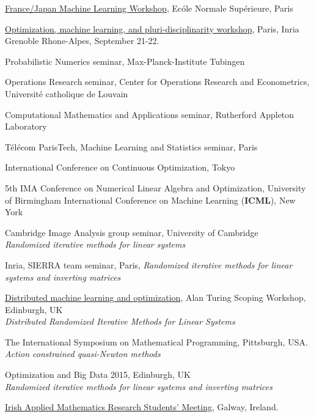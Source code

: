 \begin{bibsection}
\item  \href{http://fjml.marcocuturi.net/speakers/}{France/Japan Machine Learning Workshop}, Ec\'ole Normale Sup\'erieure, Paris
		\item	\href{https://thoth.inrialpes.fr/people/mairal/macaron/workshop2017/}{Optimization, machine learning, and pluri-disciplinarity workshop}, Paris, Inria Grenoble Rhone-Alpes, September 21-22.
		\item Probabilistic Numerics seminar, Max-Planck-Institute Tubingen
		\item Operations Research seminar, Center for Operations Research and Econometrics, Universit\'e catholique de Louvain
		\item [2016]		
		 Computational Mathematics and Applications seminar, Rutherford Appleton Laboratory
		\item T\'el\'ecom ParisTech, Machine Learning and Statistics seminar, Paris
 	    \item International Conference on Continuous Optimization, Tokyo
 	     \item  5th IMA Conference on Numerical Linear Algebra and Optimization, University of Birmingham
        International Conference on Machine Learning ({\bf ICML}), New York
		\item Cambridge Image Analysis group seminar, University of Cambridge \\
		 \emph{Randomized iterative methods for linear systems}
\item  Inria, SIERRA team seminar, Paris,
\emph{Randomized iterative methods for linear systems and inverting matrices}
		\item[ 2015]  	\href{http://www.icms.org.uk/workshop.php?id=367}{Distributed machine learning and optimization}, Alan Turing Scoping Workshop, Edinburgh, UK \\
		\emph{ Distributed Randomized Iterative Methods for Linear Systems }
\item The International Symposium on Mathematical Programming, Pittsburgh, USA. \\
 \emph{Action constrained quasi-Newton methods}
\item Optimization and Big Data 2015, Edinburgh, UK\\ 
 \emph{Randomized iterative methods for linear systems and inverting matrices}
\item[ 2014] 
 \href{http://www.maths.nuigalway.ie/SIAM-Galway/PG-Conf-14/}{Irish Applied Mathematics Research Students' Meeting}, Galway, Ireland.\\

\end{bibsection}
